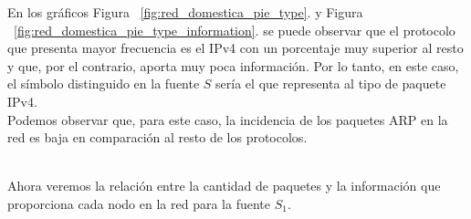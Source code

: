 En los gráficos Figura ~\ref{fig:red_domestica_pie_type}. y Figura ~\ref{fig:red_domestica_pie_type_information}. se puede observar que el protocolo que presenta mayor frecuencia es el IPv4 con un porcentaje muy superior al resto y que, por el contrario, aporta muy poca información. Por lo tanto, en este caso, el símbolo distinguido en la fuente $S$ sería el que representa al tipo de paquete IPv4.
\\
Podemos observar que, para este caso, la incidencia de los paquetes ARP en la red es baja en comparación al resto de los protocolos.
\\
\\
\FloatBarrier

Ahora veremos la relación entre la cantidad de paquetes y la información que proporciona cada nodo en la red para la fuente $S_1$. 


